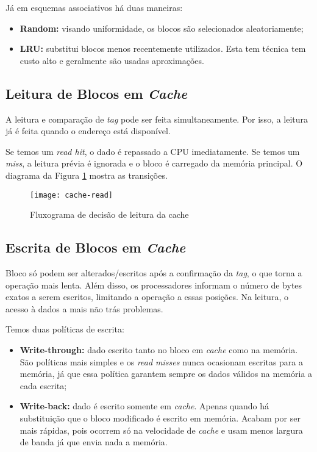 Já em esquemas associativos há duas maneiras:
\begin{itemize}
  \item \textbf{Random:} visando uniformidade, os blocos são selecionados aleatoriamente;

  \item \textbf{LRU:} substitui blocos menos recentemente utilizados. Esta tem técnica tem custo alto e geralmente são usadas aproximações.
\end{itemize}


\subsection{Leitura de Blocos em \textit{Cache}}
A leitura e comparação de \textit{tag} pode ser feita simultaneamente. Por isso, a leitura já é feita quando o endereço está disponível.

Se temos um \textit{read hit}, o dado é repassado a CPU imediatamente. Se temos um \textit{miss}, a leitura prévia é ignorada e o bloco é carregado da memória principal. O diagrama da Figura \ref{fig:reading-cache} mostra as transições.

\begin{figure}[ht]
  \texttt{[image: cache-read]}
  \caption{Fluxograma de decisão de leitura da cache}
  \label{fig:reading-cache}
\end{figure}

\subsection{Escrita de Blocos em \textit{Cache}}
Bloco só podem ser alterados/escritos após a confirmação da \textit{tag}, o que torna a operação mais lenta. Além disso, os processadores informam o número de bytes exatos a serem escritos, limitando a operação a essas posições. Na leitura, o acesso à dados a mais não trás problemas.

Temos duas políticas de escrita:
\begin{itemize}
  \item \textbf{Write-through:} dado escrito tanto no bloco em \textit{cache} como na memória. São políticas mais simples e os \textit{read misses} nunca ocasionam escritas para a memória, já que essa política garantem sempre os dados válidos na memória a cada escrita;

  \item \textbf{Write-back:} dado é escrito somente em \textit{cache}. Apenas quando há substituição que o bloco modificado é escrito em memória. Acabam por ser mais rápidas, pois ocorrem só na velocidade de \textit{cache} e usam menos largura de banda já que envia nada a memória.
\end{itemize}

